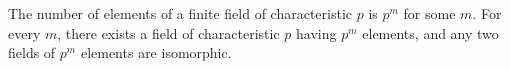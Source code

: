 The number of elements of a finite field of characteristic $p$ is $p^m$ for some $m$. For every $m$, there exists a field of characteristic $p$ having $p^m$ elements, and any two fields of $p^m$ elements are isomorphic.
